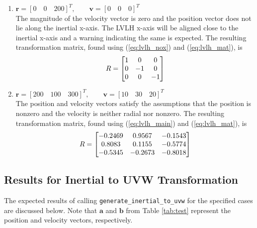 \documentclass[11pt,fleqn]{report}
\begin{document}
\begin{enumerate}
 \item $\textbf{r} = [0 \quad 0 \quad 200]^T, \qquad
\textbf{v} = [0 \quad 0 \quad 0]^T$ \\
 The magnitude of the velocity vector is zero and the position vector
 does not lie along the inertial x-axis. The LVLH x-axis will be
 aligned close to the inertial x-axis and a warning indicating the
 same is expected. The resulting transformation matrix, found using
 (\ref{eq:lvlh_nox}) and (\ref{eq:lvlh_mat}), is
 \begin{equation*}
\hfill R = \begin{bmatrix} 1 & 0 & 0 \\
 0 & -1 & 0 \\
 0 & 0 & -1
 \end{bmatrix} \hfill
 \end{equation*}

 \item $\textbf{r} = [200 \quad 100 \quad 300]^T, \qquad
\textbf{v} = [10\quad 30\quad 20]^T$ \\
 The position and velocity vectors satisfy the assumptions that
 the position is nonzero and the velocity is neither radial nor nonzero.
 The resulting transformation matrix, found using (\ref{eq:lvlh_main})
 and (\ref{eq:lvlh_mat}), is
 \begin{equation*}
\hfill R = \begin{bmatrix} -0.2469 & 0.9567 & -0.1543 \\
0.8083 & 0.1155 & -0.5774 \\
 -0.5345 & -0.2673 & -0.8018
 \end{bmatrix} \hfill
 \end{equation*}
\end{enumerate}


\subsection{Results for Inertial to UVW Transformation}
The expected results of calling \texttt{generate\_inertial\_to\_uvw} for
the specified cases are discussed below. Note that $\textbf{a}$ and
$\textbf{b}$ from Table \ref{tab:test} represent the position and
velocity vectors, respectively.
\end{document}
